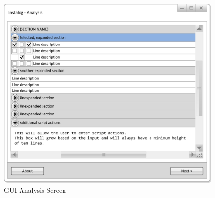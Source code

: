\begin{figure}[h]
  	\centering
	\includegraphics{figures/gui/Analysis.png}
  	\caption{GUI Analysis Screen}
  	\label{fig:gui_analyze}
\end{figure}

